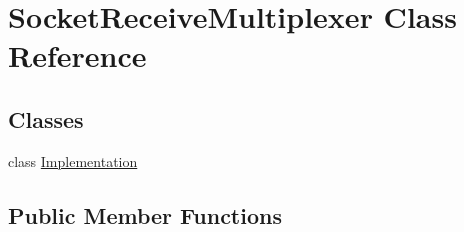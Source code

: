 \hypertarget{class_socket_receive_multiplexer}{}\section{Socket\+Receive\+Multiplexer Class Reference}
\label{class_socket_receive_multiplexer}
\subsection*{Classes}
\begin{DoxyCompactItemize}
\item 
class \hyperlink{class_socket_receive_multiplexer_1_1_implementation}{Implementation}
\end{DoxyCompactItemize}
\subsection*{Public Member Functions}
